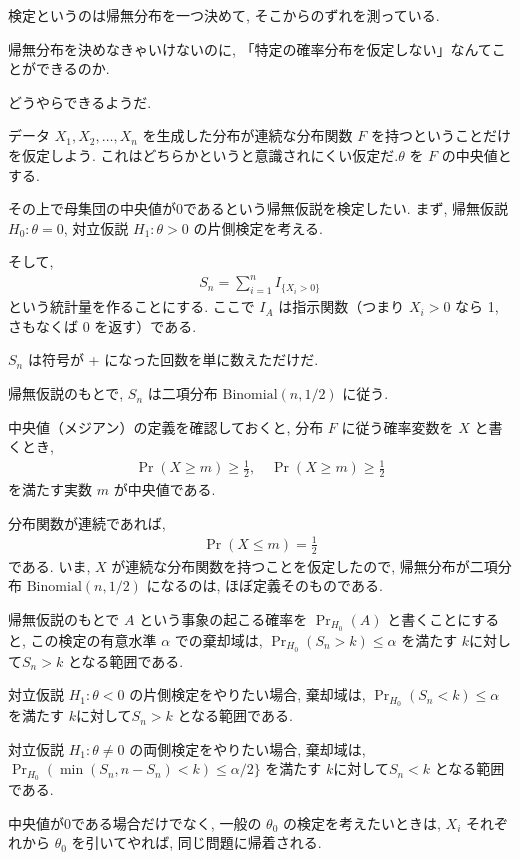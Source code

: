 \documentclass[12pt]{jsarticle}
\begin{document}
検定というのは帰無分布を一つ決めて, そこからのずれを測っている. 

帰無分布を決めなきゃいけないのに, 「特定の確率分布を仮定しない」なんてことができるのか. 

どうやらできるようだ.

データ $X_1, X_2, \ldots, X_n$ を生成した分布が連続な分布関数 $F$ を持つということだけを仮定しよう. これはどちらかというと意識されにくい仮定だ.$\theta$ を $F$ の中央値とする. 

その上で母集団の中央値が0であるという帰無仮説を検定したい. 
まず, 帰無仮説 $H_0: \theta = 0$, 対立仮説 $H_1: \theta > 0$ の片側検定を考える.

そして, 
\begin{align}
S_n = \sum_{i=1}^{n} I_{\{X_i > 0\}}
\end{align}
という統計量を作ることにする. ここで $I_A$ は指示関数（つまり $X_i > 0$ なら 1, さもなくば 0 を返す）である. 

$S_n$ は符号が + になった回数を単に数えただけだ. 

帰無仮説のもとで, $S_n$ は二項分布 $\mathrm{Binomial}(n, 1/2)$ に従う.

中央値（メジアン）の定義を確認しておくと, 分布 $F$ に従う確率変数を $X$ と書くとき, 
\begin{align}
\Pr(X \ge m) \ge \frac{1}{2}, \quad \Pr(X \ge m) \ge \frac{1}{2}
\end{align}
を満たす実数 $m$ が中央値である. 

分布関数が連続であれば, 
\begin{align}
\Pr(X \le m) = \frac{1}{2}
\end{align}
である. 
いま, $X$ が連続な分布関数を持つことを仮定したので, 帰無分布が二項分布 $\mathrm{Binomial}(n, 1/2)$ になるのは, ほぼ定義そのものである.

帰無仮説のもとで $A$ という事象の起こる確率を $\Pr_{H_0}(A)$ と書くことにすると, この検定の有意水準 $\alpha$ での棄却域は, $\Pr_{H_0}(S_n>k)\le\alpha$ を満たす $k$に対して$S_n>k$ となる範囲である.

対立仮説 $H_1: \theta < 0$ の片側検定をやりたい場合, 棄却域は, $\Pr_{H_0}(S_n<k)\le\alpha$ を満たす $k$に対して$S_n>k$ となる範囲である.

対立仮説 $H_1: \theta \neq 0$ の両側検定をやりたい場合, 棄却域は, $\Pr_{H_0}(\min(S_n,n-S_n)<k)\le\alpha/2\}$ を満たす $k$に対して$S_n<k$ となる範囲である.

中央値が0である場合だけでなく, 一般の $\theta_0$ の検定を考えたいときは, $X_i$ それぞれから $\theta_0$ を引いてやれば, 同じ問題に帰着される. 
\end{document}
